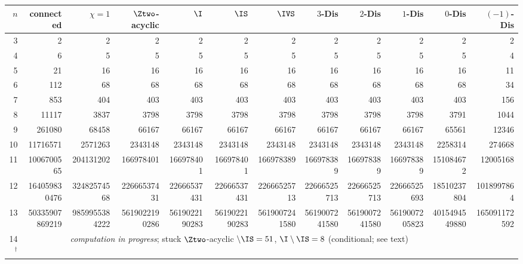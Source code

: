 \begin{tabular}{@{}rrrrrrrrrrrr@{}}
\toprule
$n$ & connected & $\chi=1$ & $\Ztwo$-acyclic & $\I$ & $\IS$ & $\IVS$ & $3$-Dis & $2$-Dis & $1$-Dis & $0$-Dis & $(-1)$-Dis \\
\midrule
3 & \num{2} & \num{2} & \num{2} & \num{2} & \num{2} & \num{2} & \num{2} & \num{2} & \num{2} & \num{2} & \num{2} \\
4 & \num{6} & \num{5} & \num{5} & \num{5} & \num{5} & \num{5} & \num{5} & \num{5} & \num{5} & \num{5} & \num{4} \\
5 & \num{21} & \num{16} & \num{16} & \num{16} & \num{16} & \num{16} & \num{16} & \num{16} & \num{16} & \num{16} & \num{11} \\
6 & \num{112} & \num{68} & \num{68} & \num{68} & \num{68} & \num{68} & \num{68} & \num{68} & \num{68} & \num{68} & \num{34} \\
7 & \num{853} & \num{404} & \num{403} & \num{403} & \num{403} & \num{403} & \num{403} & \num{403} & \num{403} & \num{403} & \num{156} \\
8 & \num{11117} & \num{3837} & \num{3798} & \num{3798} & \num{3798} & \num{3798} & \num{3798} & \num{3798} & \num{3798} & \num{3791} & \num{1044} \\
9 & \num{261080} & \num{68458} & \num{66167} & \num{66167} & \num{66167} & \num{66167} & \num{66167} & \num{66167} & \num{66167} & \num{65561} & \num{12346} \\
10 & \num{11716571} & \num{2571263} & \num{2343148} & \num{2343148} & \num{2343148} & \num{2343148} & \num{2343148} & \num{2343148} & \num{2343148} & \num{2258314} & \num{274668} \\
11 & \num{1006700565} & \num{204131202} & \num{166978401} & \num{166978401} & \num{166978401} & \num{166978389} & \num{166978389} & \num{166978389} & \num{166978389} & \num{151084672} & \num{12005168} \\
12 & \num{164059830476} & \num{32482574568} & \num{22666537431} & \num{22666537431} & \num{22666537431} & \num{22666525713} & \num{22666525713} & \num{22666525713} & \num{22666525693} & \num{18510237804} & \num{1018997864} \\
13 & \num{50335907869219} & \num{9859955384222} & \num{5619022190286} & \num{5619022190283} & \num{5619022190283} & \num{5619007241580} & \num{5619007241580} & \num{5619007241580} & \num{5619007205823} & \num{4015494549880} & \num{165091172592} \\
14$^{\dagger}$ & & \multicolumn{10}{l}{\emph{computation in progress}; stuck $\Ztwo$-acyclic $\setminus\IS=51$, $\I\setminus\IS=8$ (conditional; see text)} \\
\bottomrule
\end{tabular}